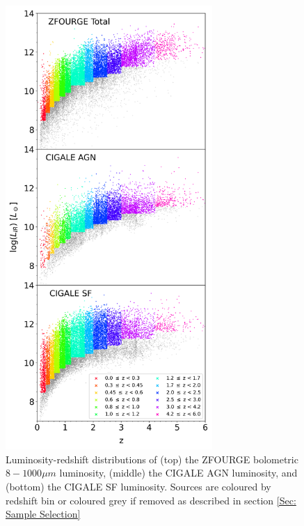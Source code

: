 \begin{figure}
    \centering
    \includegraphics[width=0.7\textwidth]{Figures/LIR_vs_Z.png}
    \caption{Luminosity-redshift distributions of (top) the ZFOURGE bolometric $8-1000\mu m$ luminosity, (middle) the CIGALE AGN luminosity, and (bottom) the CIGALE SF luminosity. Sources are coloured by redshift bin or coloured grey if removed as described in section \ref{Sec: Sample Selection}}
    \label{Fig: ZF Lum vs z}
\end{figure}

